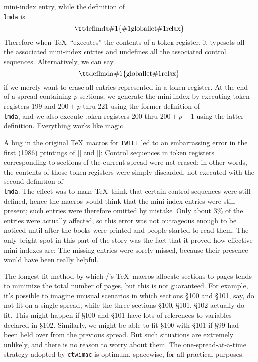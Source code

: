 mini-index entry, while the definition of {\tt\\lmda} is
$$\hbox{\tt\\def\\lmda\#1\{\#1\\global\\let\#1\\relax\}}$$
Therefore when \TeX\ ``executes'' the contents of a token register, it
typesets all the associated mini-index entries and undefines all the
associated control sequences. Alternatively, we can say
$$\hbox{\tt\\def\\lmda\#1\{\\global\\let\#1\\relax\}}$$
if we merely want to erase all entries represented in a token register. At
the end of a spread containing $p$ sections, we generate the mini-index
by executing token registers
199 and $200+p$ thru 221 using the former definition of {\tt\\lmda},
 and we also execute token registers 200 thru $200+p-1$
using the latter definition. Everything works like magic.

A bug in the original \TeX\ macros for {\tt TWILL} led to an embarrassing
error in the first (1986) printings of [\TTP] and [\MTP]: Control sequences
in token registers corresponding to sections of the current spread were not
erased; in other words, the contents of those token registers were simply
discarded, not executed with the second definition of {\tt\\lmda}.  The
effect was to make \TeX\ think that certain control sequences were still
defined, hence the macros would think that the mini-index entries were still
present; such entries were therefore omitted by mistake. Only about 3\% of
the entries were actually affected, so this error was not outrageous enough
to be noticed until after the books were printed and people started to read
them. The only bright spot in this part of the story was the fact that it
proved how effective mini-indexes are: The missing entries were sorely
missed, because their presence would have been really helpful.

The longest-fit method by which \CTWILL/'s \TeX\ macros allocate sections
to pages tends to minimize the total number of pages, but this is
not guaranteed. For example, it's
possible to imagine unusual scenarios in which sections \S100 and
\S101, say, do not fit on a single spread, while the three sections
\S100, \S101, \S102 actually do fit. This might happen if \S100 and \S101
have lots of references to variables declared in \S102. Similarly, we might
be able to fit \S100 with \S101 if \S99 had been held over from the
previous spread. But such situations
are extremely unlikely, and there is no reason to worry about them.
The one-spread-at-a-time strategy adopted by {\tt ctwimac}
is optimum, spacewise, for all practical purposes.

